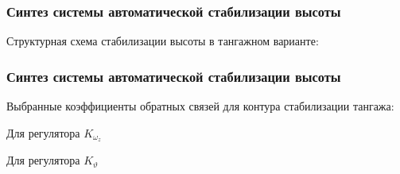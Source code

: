 \documentclass{beamer}
\begin{document}
\begin{frame}
    \frametitle{Синтез системы автоматической стабилизации высоты}
\begin{center}
    Структурная схема стабилизации высоты в тангажном варианте:
    \vspace{14pt}

    \resizebox{1.35\textwidth}{!}{}
\end{center}

\end{frame}
\begin{frame}[t]
    \frametitle{Синтез системы автоматической стабилизации высоты}
    \begin{center}
        Выбранные коэффициенты обратных связей для контура стабилизации тангажа:
        \vspace{14pt}

        \begin{minipage}{0.45\textwidth}
            \begin{center}
                Для регулятора $K_{\omega_z}$\\
                \resizebox{\textwidth}{!}{}
            \end{center}
        \end{minipage}
        \hfill
        \begin{minipage}{0.45\textwidth}
            \begin{center}
                Для регулятора $K_{\vartheta}$\\
                \resizebox{\textwidth}{!}{}
            \end{center}
        \end{minipage}
    \end{center}
\end{frame}
\end{document}
